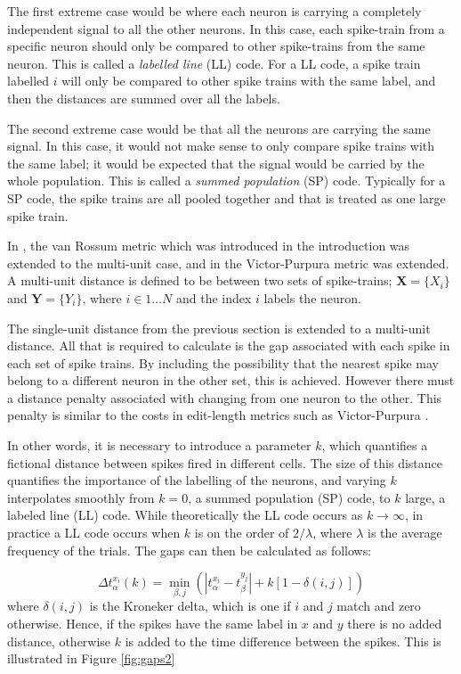 The first extreme case would be where each neuron is carrying a completely independent signal to all the other neurons.  In this case, each spike-train from a specific neuron should only be compared to other spike-trains from the same neuron.  This is called a \emph{labelled line} (LL) code.  For a LL code, a spike train labelled $i$ will only be compared to other spike trains with the same label, and then the distances are summed over all the labels.

The second extreme case would be that all the neurons are carrying the same signal.  In this case, it would not make sense to only compare spike trains with the same label; it would be expected that the signal would be carried by the whole population.  This is called a \emph{summed population} (SP) code.  Typically for a SP code, the spike trains are all pooled together and that is treated as one large spike train.

In \citep{HoughtonSen2008a}, the van Rossum metric which was introduced in the introduction was extended to the multi-unit case, and in \citep{Aronovetal2003a} the Victor-Purpura metric was extended.  A multi-unit distance is defined to be between two sets of spike-trains; $\mathbf{X}=\{ X_i \}$ and $ \mathbf{Y}=\{ Y_i \}$, where $i \in 1\ldots N$ and the index $i$ labels the neuron.

The single-unit distance from the previous section is extended to a multi-unit distance. All that is required to calculate is the gap associated with each spike in each set of spike trains. By including the possibility that the nearest spike may belong to a different neuron in the other set, this is achieved. However there must a distance penalty associated with changing from one neuron to the other. This penalty is similar to the costs in edit-length metrics such as Victor-Purpura \citep{VictorPurpura1997a}. 

In other words, it is necessary to introduce a parameter $k$, which quantifies a fictional distance between spikes fired in different cells.  The size of this distance quantifies the importance of the labelling of the neurons, and varying $k$ interpolates smoothly from $k=0$, a summed population (SP) code, to $k$ large, a labeled line  (LL) code.  While theoretically the LL code occurs as $k \rightarrow \infty$, in practice a LL code occurs when $k$ is on the order of $2/\lambda$, where $\lambda$ is the average frequency of the trials.   The gaps can then be calculated as follows:

\begin{equation}\label{initspike}
\Delta t_{\alpha}^{x_i}(k) = \min_{\beta,j} \left( |t_{\alpha}^{x_i} - t_{\beta}^{y_j} | + k\left[1-\delta(i,j)\right] \right)
\end{equation}
where $\delta(i,j)$ is the Kroneker delta, which is one if $i$ and $j$ match and zero otherwise. Hence, if the spikes have the same label in $x$ and $y$ there is no added distance, otherwise $k$ is added to the time difference between the spikes.  This is illustrated in Figure \ref{fig:gaps2}

